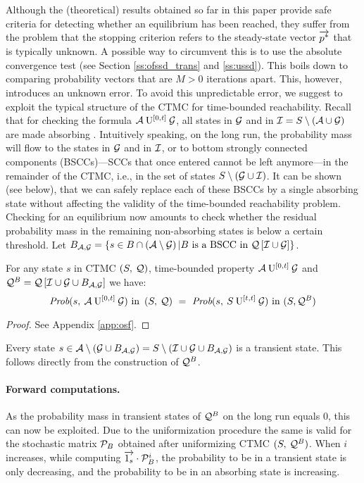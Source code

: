 \documentclass{entcs}
\begin{document}
	Although the (theoretical) results obtained so far in this paper provide safe criteria for detecting whether an equilibrium has been reached, they suffer from the problem that the stopping criterion refers to the steady-state vector $\overrightarrow{p^{*}}$ that is typically unknown.  A possible way to circumvent this is to use the absolute convergence test (see Section \ref{ss:ofssd_trans} and \ref{ss:ussd}).  This boils down to comparing probability vectors that are $M > 0$ iterations apart.  This, however, introduces an unknown error.  To avoid this unpredictable error, we suggest to exploit the typical structure of the CTMC for time-bounded reachability.  Recall that for checking the formula $\mathcal{A} \: \mathrm{U}^{[0,t]} \: \mathcal{G}$, all states in $\mathcal{G}$ and in $\mathcal{I} = S \setminus \left( \mathcal{A} \cup \mathcal{G} \right)$ are made absorbing \cite{BaierHHK_TSE03}.  Intuitively speaking, on the long run, the probability mass will flow to the states in $\mathcal{G}$ and in $\mathcal{I}$, or to bottom strongly connected components (BSCCs)---SCCs that once entered cannot be left anymore---in the remainder of the CTMC, i.e., in the set of states $S \setminus (\mathcal{G} \cup \mathcal{I})$.  It can be shown (see below), that we can safely replace each of these BSCCs by a single absorbing state without affecting the validity of the time-bounded reachability problem.  Checking for an equilibrium now amounts to check whether the residual probability mass in the remaining non-absorbing states is below a certain threshold.
	Let $B_{ \mathcal{A}, \mathcal{G} } = \left\{ s \in B \cap \left( \mathcal{A} \setminus \mathcal{G} \right) | B \text{ is a BSCC in } \mathcal{Q}\left[ \mathcal{I} \cup \mathcal{G} \right] \right\}$.
	
	\begin{proposition}
		For any state $s$ in CTMC $\left( S,\: \mathcal{Q} \right)$, time-bounded property $\mathcal{A} \: \mathrm{U}^{[0,t]} \: \mathcal{G}$ and $\mathcal{Q}^{B} = \mathcal{Q} \left[ \mathcal{I} \cup \mathcal{G} \cup B_{ \mathcal{A}, \mathcal{G} } \right]$ we have:
		{\small
			\[
				\PsaUg{s}{0}{t}\text{ in }\CTMC \ = \ \PsSUg{s}{t}{t}\text{ in }(S,\mQB)
			\]
		}
		\label{pr:absorbing}
	\end{proposition}
	{\small
		\begin{proof}
			See Appendix \ref{app:osf}.
		\end{proof}
	}
	Every state $s \in \mathcal{A} \setminus \left( \mathcal{G} \cup B_{ \mathcal{A}, \mathcal{G} } \right) = S \setminus (\mathcal{I} \cup \mathcal{G} \cup B_{ \mathcal{A}, \mathcal{G} })$ is a transient state. This follows directly from the construction of $\mathcal{Q}^{B}$. 
	
	\paragraph{Forward computations.}
	As the probability mass in transient states of $\mathcal{Q}^{B}$ on the long run equals 0, this can now be exploited. Due to the uniformization procedure the same is valid for the stochastic matrix $\mathcal{P}_{B}$ obtained after uniformizing CTMC $(S,\:\mathcal{Q}^{B})$. When $i$ increases, while computing $\overrightarrow{1_{s} } \cdot \mathcal{P}_{B}^{i}$, the probability to be in a transient state is only decreasing, and the probability to be in an absorbing state is increasing.
	
\end{document}
